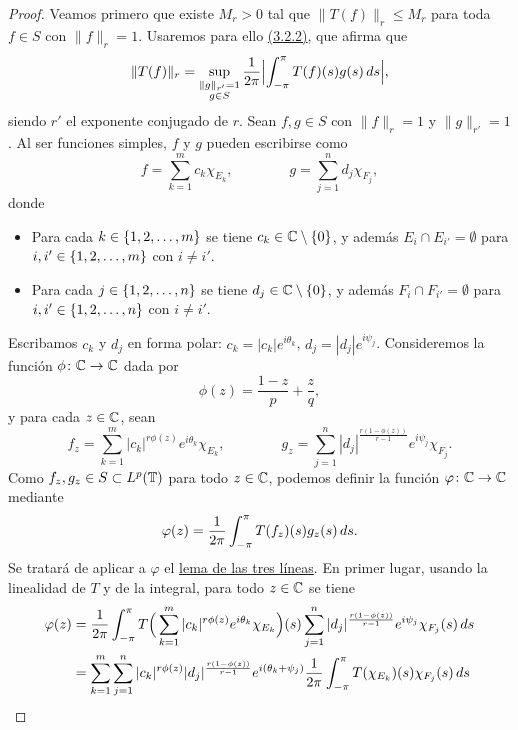 \documentclass[a4paper, 12pt]{book}
\begin{document}
\begin{proof}
    Veamos primero que existe $M_r>0$ tal que $\|T(f)\|_r \leq M_r$ para toda $f \in S$ con $\|f\|_r = 1$. Usaremos para ello \hyperref[3.2.2]{(3.2.2)}, que afirma que
    \begin{equation}\label{3.2.6}
        \|T(f)\|_r = \sup_{\substack{\|g\|_{r'}=1 \\ g \in S}}\frac{1}{2\pi}\Bigl|\integral[s]{-\pi}{\pi}{T(f)(s)g(s)}\Bigr|,
    \end{equation}
    siendo $r'$ el exponente conjugado de $r$. Sean $f,g \in S$ con $\|f\|_r = 1$ y $\|g\|_{r'} = 1$. Al ser funciones simples, $f$ y $g$ pueden escribirse como
    \[f = \sum_{k=1}^m c_k\chi_{E_k}, \qquad \qquad g = \sum_{j=1}^n d_j \chi_{F_j},\]
    donde
    \begin{itemize}
        \item Para cada $k \in\{1,2,\mathellipsis,m\}$ se tiene $c_k \in \C\setminus \{0\}$, y además $E_i \cap E_{i'} = \emptyset$ para $i,i'\in\{1,2,\mathellipsis,m\}$ con $i\neq i'$.
        \item Para cada $j \in\{1,2,\mathellipsis,n\}$ se tiene $d_j \in \C\setminus \{0\}$, y además $F_i \cap F_{i'} = \emptyset$ para $i,i'\in\{1,2,\mathellipsis,n\}$ con $i\neq i'$.
    \end{itemize}
    Escribamos $c_k$ y $d_j$ en forma polar: $c_k = |c_k|e^{i\theta_k}$, $d_j = |d_j|e^{i\psi_j}$. Consideremos la función $\phi \colon \C \to \C$ dada por
    \[\phi(z) = \frac{1-z}{p}+\frac{z}{q},\]
    y para cada $z \in \C$, sean
    \[f_z = \sum_{k=1}^m |c_k|^{r\phi(z)}e^{i\theta_k}\chi_{E_k}, \qquad \qquad g_z =  \sum_{j=1}^n |d_j|^{\frac{r(1-\phi(z))}{r-1}}e^{i\psi_j}\chi_{F_j}.\]
    Como $f_z,g_z \in S \subset L^p(\T)$ para todo $z \in \C$, podemos definir la función $\varphi \colon \C \to \C$ mediante
    \[\varphi(z) = \frac{1}{2\pi}\integral[s]{-\pi}{\pi}{T(f_z)(s)g_z(s)}.\]
    Se tratará de aplicar a $\varphi$ el \hyperref[3.2.3]{lema de las tres líneas}. En primer lugar, usando la linealidad de $T$ y de la integral, para todo $z\in\C$ se tiene
    \begin{align}\label{3.2.7}
        \varphi(z) &= \frac{1}{2\pi}\integral[s]{-\pi}{\pi}{T\Bigl(\,\sum_{k=1}^m |c_k|^{r\phi(z)}e^{i\theta_k}\chi_{E_k}\Bigr)(s)\sum_{j=1}^n |d_j|^{\frac{r(1-\phi(z))}{r-1}}e^{i\psi_j}\chi_{F_j}(s)} \notag \\
        &= \sum_{k=1}^m \sum_{j=1}^n |c_k|^{r\phi(z)}|d_j|^{\frac{r(1-\phi(z))}{r-1}}e^{i(\theta_k+\psi_j)}\frac{1}{2\pi}\integral[s]{-\pi}{\pi}{T(\chi_{E_k})(s)\chi_{F_j}(s)} \notag \\

\end{align}
\end{proof}
\end{document}
